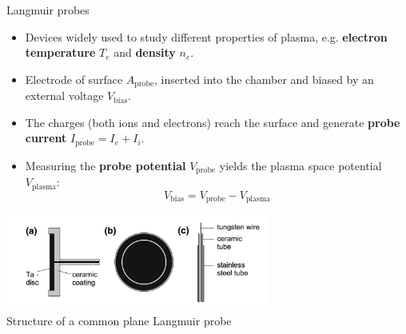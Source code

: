 \documentclass[10pt]{beamer}
\newcommand{\probecurrent}[0]{\ensuremath{I_{\mathrm{probe}}}}
\newcommand{\biasvoltage}{\ensuremath{V_{\mathrm{bias}}}}
\newcommand{\probevoltage}{\ensuremath{V_{\mathrm{probe}}}}
\newcommand{\plasmavoltage}{\ensuremath{V_{\mathrm{plasma}}}}
\begin{document}
\begin{frame}{{Langmuir probes}}
    \vspace{0.2cm}
    \begin{itemize}
        \item Devices widely used to study different properties of plasma, e.g. \textbf{electron temperature} $T_e$ and \textbf{density} $n_e$.
        
        \item Electrode of surface $A_{\mathrm{probe}}$, inserted into the chamber and biased by an external voltage $\biasvoltage$.
        \item The charges (both ions and electrons) reach the surface and generate \textbf{probe current} $\probecurrent = I_e + I_i$.
        \item Measuring the \textbf{probe potential} $\probevoltage$ yields the plasma space potential $\plasmavoltage$:
        \begin{equation*}
            \biasvoltage= \probevoltage - \plasmavoltage
        \end{equation*}
    \end{itemize}

    \begin{center}
        \includegraphics[width=0.65\textwidth]{../figures/langmuir_probe.png}
        \\
        \small Structure of a common plane Langmuir probe\, 
    \end{center}
\end{frame}
\end{document}
